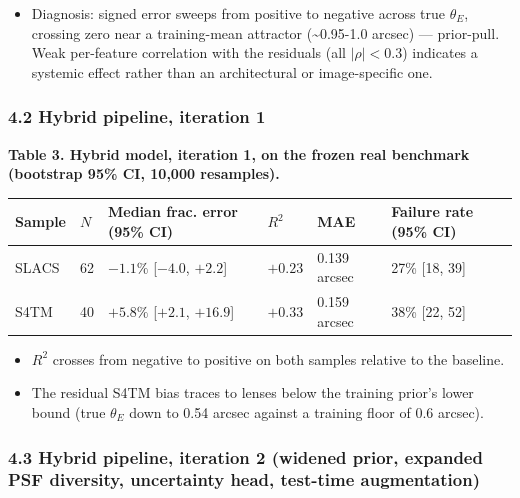 \documentclass[
  11pt,
]{article}
\providecommand{\tightlist}{%
  \setlength{\itemsep}{0pt}\setlength{\parskip}{0pt}}
\begin{document}
\begin{itemize}
\tightlist
\item
  Diagnosis: signed error sweeps from positive to negative across true
  \(\theta_E\), crossing zero near a training-mean attractor
  (\textasciitilde0.95-1.0 arcsec) --- prior-pull. Weak per-feature
  correlation with the residuals (all \(|\rho| < 0.3\)) indicates a
  systemic effect rather than an architectural or image-specific one.
\end{itemize}

\hypertarget{hybrid-pipeline-iteration-1}{%
\subsubsection{4.2 Hybrid pipeline, iteration
1}\label{hybrid-pipeline-iteration-1}}

\textbf{Table 3. Hybrid model, iteration 1, on the frozen real benchmark
(bootstrap 95\% CI, 10,000 resamples).}

\begin{longtable}[]{@{}llllll@{}}
\toprule
Sample & \(N\) & Median frac. error (95\% CI) & \(R^2\) & MAE & Failure
rate (95\% CI) \\
\midrule
\endhead
SLACS & 62 & \(-1.1\%\) {[}\(-4.0\), \(+2.2\){]} & \(+0.23\) & 0.139
arcsec & 27\% {[}18, 39{]} \\
S4TM & 40 & \(+5.8\%\) {[}\(+2.1\), \(+16.9\){]} & \(+0.33\) & 0.159
arcsec & 38\% {[}22, 52{]} \\
\bottomrule
\end{longtable}

\begin{itemize}
\tightlist
\item
  \(R^2\) crosses from negative to positive on both samples relative to
  the baseline.
\item
  The residual S4TM bias traces to lenses below the training prior's
  lower bound (true \(\theta_E\) down to 0.54 arcsec against a training
  floor of 0.6 arcsec).
\end{itemize}

\hypertarget{hybrid-pipeline-iteration-2-widened-prior-expanded-psf-diversity-uncertainty-head-test-time-augmentation}{%
\subsubsection{4.3 Hybrid pipeline, iteration 2 (widened prior, expanded
PSF diversity, uncertainty head, test-time
augmentation)}\label{hybrid-pipeline-iteration-2-widened-prior-expanded-psf-diversity-uncertainty-head-test-time-augmentation}}
\end{document}
